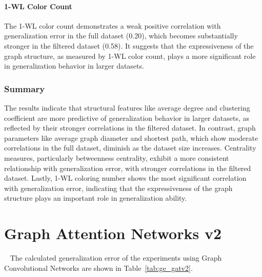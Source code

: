 \paragraph{1-WL Color Count}
The 1-WL color count demonstrates a weak positive correlation with generalization error in the full dataset (0.20), which becomes substantially stronger in the filtered dataset (0.58). It suggests that the expressiveness of the graph structure, as measured by 1-WL color count, plays a more significant role in generalization behavior in larger datasets.

\subsubsection{Summary}
The results indicate that structural features like average degree and clustering coefficient are more predictive of generalization behavior in larger datasets, as reflected by their stronger correlations in the filtered dataset. In contrast, graph parameters like average graph diameter and shortest path, which show moderate correlations in the full dataset, diminish as the dataset size increases. Centrality measures, particularly betweenness centrality, exhibit a more consistent relationship with generalization error, with stronger correlations in the filtered dataset. Lastly, 1-WL coloring number shows the most significant correlation with generalization error, indicating that the expressiveness of the graph structure plays an important role in generalization ability.

\section{Graph Attention Networks v2}~\label{sec:result_gatv2}
The calculated generalization error of the experiments using Graph Convolutional Networks are shown in Table~\ref{tab:ge_gatv2}.

